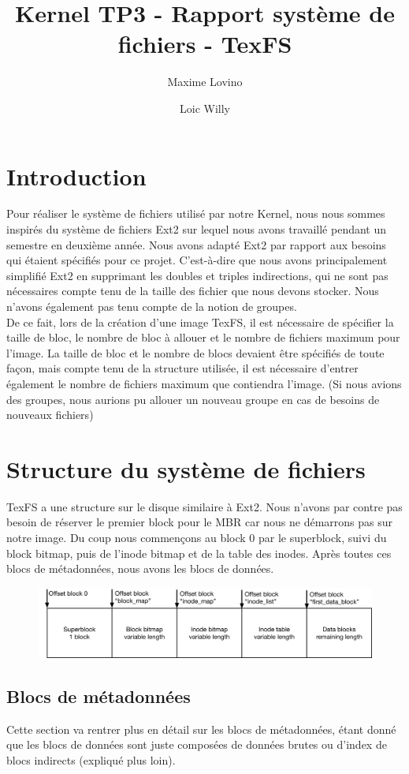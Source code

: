 \documentclass{article}
\title{Kernel TP3 - Rapport système de fichiers - TexFS}
\author{Maxime Lovino \and Loic Willy}
\begin{document}
\maketitle
\newpage
\section{Introduction}
Pour réaliser le système de fichiers utilisé par notre Kernel, nous nous sommes inspirés du système de fichiers Ext2 sur lequel nous avons travaillé pendant un semestre en deuxième année. Nous avons adapté Ext2 par rapport aux besoins qui étaient spécifiés pour ce projet. C'est-à-dire que nous avons principalement simplifié Ext2 en supprimant les doubles et triples indirections, qui ne sont pas nécessaires compte tenu de la taille des fichier que nous devons stocker. Nous n'avons également pas tenu compte de la notion de groupes.\\

De ce fait, lors de la création d'une image TexFS, il est nécessaire de spécifier la taille de bloc, le nombre de bloc à allouer et le nombre de fichiers maximum pour l'image. La taille de bloc et le nombre de blocs devaient être spécifiés de toute façon, mais compte tenu de la structure utilisée, il est nécessaire d'entrer également le nombre de fichiers maximum que contiendra l'image. (Si nous avions des groupes, nous aurions pu allouer un nouveau groupe en cas de besoins de nouveaux fichiers)
\section{Structure du système de fichiers}
TexFS a une structure sur le disque similaire à Ext2. Nous n'avons par contre pas besoin de réserver le premier block pour le MBR car nous ne démarrons pas sur notre image. Du coup nous commençons au block 0 par le superblock, suivi du block bitmap, puis de l'inode bitmap et de la table des inodes. Après toutes ces blocs de métadonnées, nous avons les blocs de données.
\begin{figure}[H]
    \centering
    \includegraphics[width=\textwidth]{FS_disk_structure.png}
\end{figure}
\subsection{Blocs de métadonnées}
Cette section va rentrer plus en détail sur les blocs de métadonnées, étant donné que les blocs de données sont juste composées de données brutes ou d'index de blocs indirects (expliqué plus loin).
\end{document}
